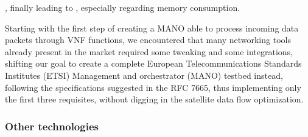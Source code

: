 \documentclass[10pt]{book}
\begin{document}
, finally leading to , especially 
regarding memory consumption.

Starting with the first step of creating a MANO able to process incoming data 
packets through VNF functions, we encountered that many networking tools already 
present in the market required some tweaking and some integrations, shifting our 
goal to create a complete  European Telecommunications Standards Institutes 
(ETSI) Management and orchestrator (MANO) testbed instead, following the 
specifications suggested in the RFC 7665, thus implementing only the first three 
requisites, without digging in the satellite data flow optimization.

\subsubsection{Other technologies}
\end{document}
